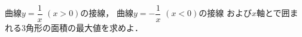 \documentclass[../../main.tex]{subfiles}
\begin{document}
曲線$\displaystyle y=\dfrac{1}{x}$ $(x>0)$の接線，
曲線$\displaystyle y=-\dfrac{1}{x}$ $(x<0)$の接線
および$x$軸とで囲まれる3角形の面積の最大値を求めよ．
\end{document}
